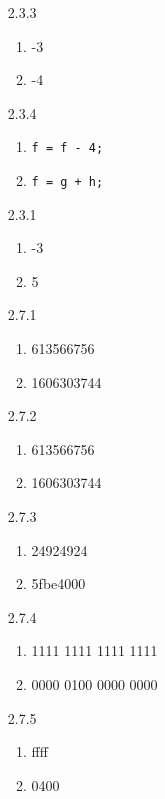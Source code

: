 \documentclass[12pt,letterpaper]{article}
\begin{document}
\begin{enumerate}
	\item[2.3.3]
		\begin{enumerate}
			\item -3
			\item -4
		\end{enumerate}

	\item[2.3.4]
		\begin{enumerate}
			\item {\tt f = f - 4;}
			\item {\tt f = g + h;}
		\end{enumerate}

	\item[2.3.1]
		\begin{enumerate}
			\item -3
			\item 5
		\end{enumerate}

	\item[2.7.1]
		\begin{enumerate}
			\item 613566756
			\item 1606303744
		\end{enumerate}

	\item[2.7.2]
		\begin{enumerate}
			\item 613566756
			\item 1606303744
		\end{enumerate}

	\item[2.7.3]
		\begin{enumerate}
			\item 24924924
			\item 5fbe4000
		\end{enumerate}

	\item[2.7.4]
		\begin{enumerate}
			\item 1111 1111 1111 1111
			\item 0000 0100 0000 0000
		\end{enumerate}

	\item[2.7.5]
		\begin{enumerate}
			\item ffff
			\item 0400
		\end{enumerate}


\end{enumerate}
\end{document}
